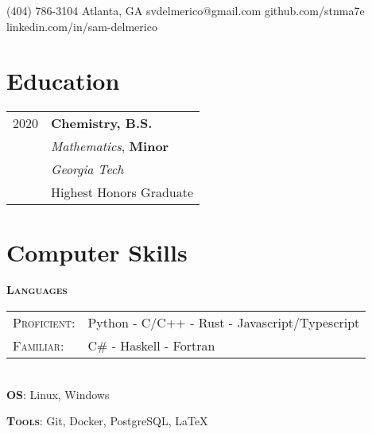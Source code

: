 \documentclass[fontsize=11pt]{tccv}
\begin{document}
    {(404) 786-3104}
    {\hspace{5pt} Atlanta, GA}
    {svdelmerico@gmail.com}
    {github.com/stnma7e}
    {linkedin.com/in/sam-delmerico}
    
    
\begin{minipage}[t]{0.35\textwidth}
    \section{Education}
    
    \begin{tabular}{rl}
        2020 & \textbf{Chemistry, B.S.} \\
             & \emph{Mathematics}, \textbf{Minor} \\
             & \emph{Georgia Tech} \\
             & Highest Honors Graduate
    \end{tabular}
\end{minipage}
\begin{minipage}[t]{0.65\textwidth}
    \section{Computer Skills}
    \textbf{\textsc{Languages}}
  
    \begin{tabulary}{\linewidth}{lL}
        \textsc{Proficient:} & Python - C/C++ - Rust - Javascript/Typescript \\
        \textsc{Familiar:} &  C\# - Haskell - Fortran
    \end{tabulary}
    \\
    
    \textbf{\textsc{OS}}:
        Linux, Windows
   
    \textbf{\textsc{Tools}}:
        Git, Docker, PostgreSQL, \LaTeX{}
\end{minipage}
\end{document}
